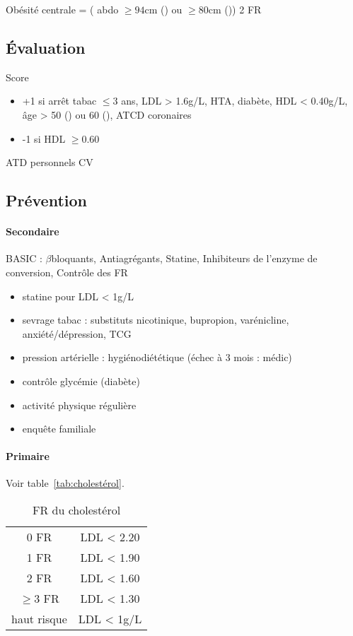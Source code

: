 \documentclass{article}
\begin{document}
Obésité centrale = (\diameter{} abdo $\ge 94 $cm (\male) ou $\ge 80$cm (\female))
\land{} 2 FR


\subsection{Évaluation}
\label{subsec:fr}
Score
\begin{itemize}
  \item +1 si {arrêt tabac $\le 3$ ans, LDL > 1.6g/L, HTA, diabète, HDL < 0.40g/L, âge > 50
(\male) ou 60 (\female), ATCD coronaires}
  \item  -1 si HDL $\ge 0.60$
\end{itemize}

ATD personnels CV

\subsection{Prévention}
\paragraph{Secondaire}
\label{subsec:basic_prev}        
BASIC : $\beta$bloquants, Antiagrégants, Statine, Inhibiteurs de l'enzyme de
conversion, Contrôle des FR

\begin{itemize}
  \item statine pour LDL < 1g/L
\item sevrage tabac : substituts nicotinique, {bupropion, varénicline},
  anxiété/dépression, TCG
  \item pression artérielle : hygiénodiététique (échec à 3 mois : médic)
  \item contrôle glycémie (diabète)
  \item activité physique régulière
  \item enquête familiale
\end{itemize}

\paragraph{Primaire}
Voir table~\ref{tab:cholestérol}.

\begin{table}
  \centering
  \begin{tabular}{cc}
    0 FR & LDL < 2.20 \\
    1 FR & LDL < 1.90\\
    2 FR & LDL < 1.60\\
    $\ge 3$ FR& LDL < 1.30 \\
    haut risque & LDL < 1g/L
  \end{tabular}
  \caption{FR du cholestérol}
  \label{tab:cholesterol}
\end{table}
\end{document}
